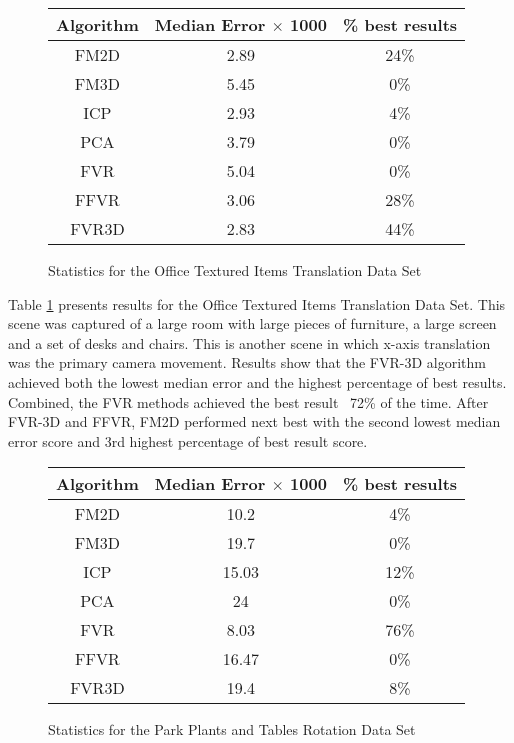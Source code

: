 \begin{figure}
\centering
\begin{tabular}{ccc}
\hline
\textbf{Algorithm} & \textbf{Median Error $\times$ 1000} & \textbf{\% best results}\\ \hline
FM2D	& 2.89 & 24\%\\
FM3D	& 5.45 & 0\%\\
ICP	& 2.93 & 4\%\\
PCA	& 3.79 & 0\%\\
FVR	& 5.04 & 0\%\\
FFVR	& 3.06 & 28\%\\
FVR3D	& 2.83 & 44\%\\
\end{tabular}
\caption{Statistics for the Office Textured Items Translation Data Set}
\label{tab:officetextureditemstranslation}
\end{figure} 

Table \ref{tab:officetextureditemstranslation} presents results for the Office Textured Items Translation Data Set. This scene was captured of a large room with large pieces of furniture, a large screen and a set of desks and chairs. This is another scene in which x-axis translation was the primary camera movement. Results show that the FVR-3D algorithm achieved both the lowest median error and the highest percentage of best results. Combined, the FVR methods achieved the best result ~72\% of the time. After FVR-3D and FFVR, FM2D performed next best with the second lowest median error score and 3rd highest percentage of best result score. \\



\begin{figure}
\centering
\begin{tabular}{ccc}
\hline
\textbf{Algorithm} & \textbf{Median Error $\times$ 1000} & \textbf{\% best results}\\ \hline
FM2D	& 10.2 & 4\%\\
FM3D	& 19.7 & 0\%\\
ICP	& 15.03 & 12\%\\
PCA	& 24 & 0\%\\
FVR	& 8.03 & 76\%\\
FFVR	& 16.47 & 0\%\\
FVR3D	& 19.4 & 8\%\\
\end{tabular}
\caption{Statistics for the Park Plants and Tables Rotation Data Set}
\label{tab:parkplantsandtables}
\end{figure} 


